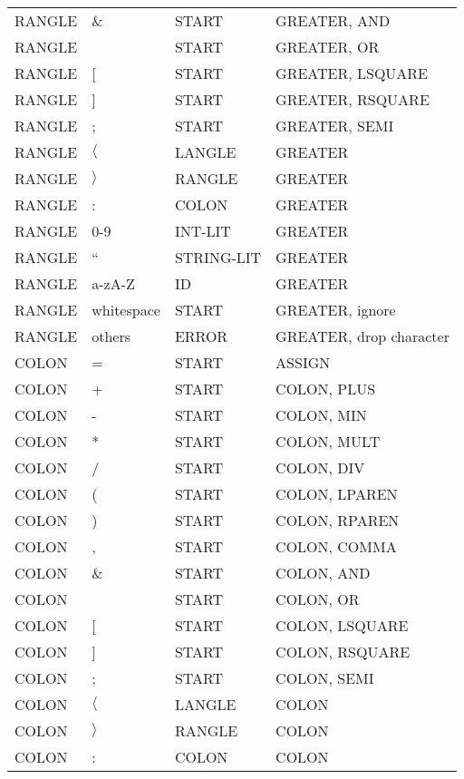 \documentclass[11pt, fleqn]{article}
\begin{document}
\begin{longtable}{l|l|l|l}
RANGLE			&	\&								&	START			&	GREATER, AND			\\
RANGLE			&	\textbar							&	START			&	GREATER, OR			\\
RANGLE			&	[								&	START			&	GREATER, LSQUARE		\\
RANGLE			&	]								&	START			&	GREATER, RSQUARE		\\
RANGLE			&	;								&	START			&	GREATER, SEMI		\\
RANGLE			&	$\langle$						&	LANGLE			&	GREATER				\\
RANGLE			&	$\rangle$						&	RANGLE			&	GREATER				\\
RANGLE			&	:								&	COLON			&	GREATER				\\
RANGLE			&	0-9								&	INT-LIT			&	GREATER				\\
RANGLE			&	``								&	STRING-LIT		&	GREATER				\\
RANGLE			&	a-zA-Z							&	ID				&	GREATER				\\
RANGLE			&	whitespace						&	START			&	GREATER, ignore		\\
RANGLE			&	others							&	ERROR			&	GREATER, drop character	\\
COLON			&	=								&	START			&	ASSIGN				\\
COLON			&	+								&	START			&	COLON, PLUS					\\
COLON			&	-								&	START			&	COLON, MIN					\\
COLON			&	*								&	START			&	COLON, MULT					\\
COLON			&	/								&	START			&	COLON, DIV					\\
COLON			&	(								&	START			&	COLON, LPAREN				\\
COLON			&	)								&	START			&	COLON, RPAREN				\\
COLON			&	,								&	START			&	COLON, COMMA				\\
COLON			&	\&								&	START			&	COLON, AND					\\
COLON			&	\textbar							&	START			&	COLON, OR					\\
COLON			&	[								&	START			&	COLON, LSQUARE				\\
COLON			&	]								&	START			&	COLON, RSQUARE				\\
COLON			&	;								&	START			&	COLON, SEMI					\\
COLON			&	$\langle$						&	LANGLE			&	COLON					\\
COLON			&	$\rangle$						&	RANGLE			&	COLON					\\
COLON			&	:								&	COLON			&	COLON					\\

\end{longtable}
\end{document}

